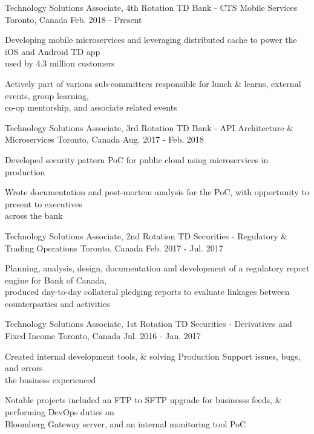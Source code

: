 \begin{cventries}
   \cventry
     {Technology Solutions Associate, 4th Rotation}
     {TD Bank - CTS Mobile Services}
     {Toronto, Canada}
     {Feb. 2018 - Present}
     {
      \begin{cvitems}
       \item {Developing mobile microservices and leveraging distributed cache to power the iOS and Android TD app \\used by
       4.3 million customers}
       \item {Actively part of various sub-committees responsible for lunch \& learns, external events, group learning, \\ co-op mentorship, and associate related events}
      \end{cvitems}
      }
	\cventry
     {Technology Solutions Associate, 3rd Rotation}
     {TD Bank - API Architecture \& Microservices}
     {Toronto, Canada}
     {Aug. 2017 - Feb. 2018}
     {
      \begin{cvitems}
       \item {Developed security pattern PoC for public cloud using microservices in production}
       \item {Wrote documentation and post-mortem analysis for the PoC, with opportunity to present to executives \\across the bank}
      \end{cvitems}
      }
   \cventry
    {Technology Solutions Associate, 2nd Rotation}
    {TD Securities - Regulatory \& Trading Operations}
    {Toronto, Canada}
    {Feb. 2017 - Jul. 2017}
    {
      \begin{cvitems}
        \item {Planning, analysis, design, documentation and development of a regulatory report engine for Bank of Canada, \\produced day-to-day collateral pledging reports to evaluate linkages between counterparties and activities}
      \end{cvitems}
    }
  \cventry
    {Technology Solutions Associate, 1st Rotation}
    {TD Securities - Derivatives and Fixed Income}
    {Toronto, Canada}
    {Jul. 2016 - Jan. 2017}
    {
      \begin{cvitems}
        \item {Created internal development tools, \& solving Production Support issues, bugs, and errors \\the business experienced}
        \item {Notable projects included an FTP to SFTP upgrade for businesss feeds, \& performing DevOps duties on \\Bloomberg Gateway server, and an internal monitoring tool PoC}

\end{cvitems}}
\end{cventries}
